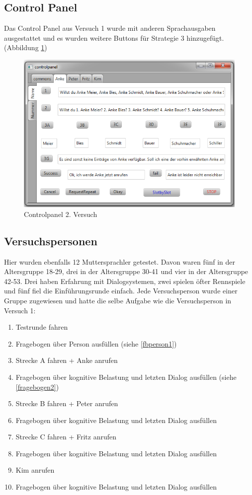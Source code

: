 \documentclass[12pt,a4paper]{scrartcl}
\begin{document}
\subsection{Control Panel}
Das Control Panel aus Versuch 1 wurde mit anderen Sprachausgaben ausgestattet und es wurden weitere Buttons für Strategie 3 hinzugefügt. (Abbildung \ref{cp2})
\begin{figure}[htbp]
\includegraphics[width=13cm]{controlpanel2.png}
\caption{Controlpanel 2. Versuch}
\label{cp2}
\end{figure}


\subsection{Versuchspersonen}

Hier wurden ebenfalls 12 Muttersprachler getestet. Davon waren fünf in der Altersgruppe 18-29, drei in der Altersgruppe 30-41 und vier in der Altersgruppe 42-53. Drei haben Erfahrung mit Dialogsystemen, zwei spielen öfter Rennspiele und fünf fiel die Einführungsrunde einfach. Jede Versuchsperson wurde einer Gruppe zugewiesen und hatte die selbe Aufgabe wie die Versuchsperson in Versuch 1: 
\begin{enumerate}
\item Testrunde fahren
\item Fragebogen über Person ausfüllen (siehe \ref{fbperson1})
\item Strecke A fahren + Anke anrufen
\item Fragebogen über kognitive Belastung und letzten Dialog ausfüllen (siehe \ref{fragebogen2})
\item Strecke B fahren + Peter anrufen
\item Fragebogen über kognitive Belastung und letzten Dialog ausfüllen
\item Strecke C fahren + Fritz anrufen
\item Fragebogen über kognitive Belastung und letzten Dialog ausfüllen 
\item Kim anrufen
\item Fragebogen über kognitive Belastung und letzten Dialog ausfüllen 
\end{enumerate}
\end{document}
